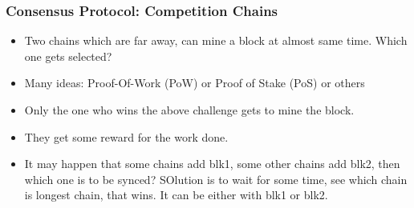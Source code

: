 \begin{frame}[fragile]\frametitle{Consensus Protocol: Competition Chains}
\begin{itemize}
\item Two chains which are far away, can mine a block at almost same time. Which one gets selected?
\item Many ideas: Proof-Of-Work (PoW) or Proof of Stake (PoS) or others
\item Only the one who wins the above challenge gets to mine the block.
\item They get some reward for the work done.
\item It may happen that some chains add blk1, some other chains add blk2, then which one is to be synced? SOlution is to wait for some time, see which chain is longest chain, that wins. It can be either with blk1 or blk2.
\end{itemize}

\end{frame}
